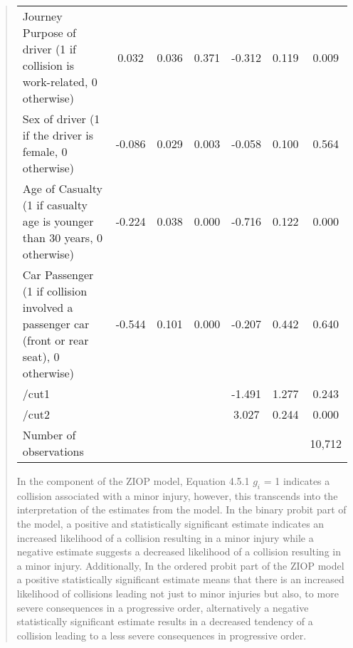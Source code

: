 \documentclass[12]{report}
\begin{document}
\begin{quote}
{\begin{table}[H]
\begin{tabular}{p{10.2cm} ccc ccc}
Journey Purpose of driver (1 if collision is work-related, 0 otherwise) & 0.032 & 0.036 & 0.371 & -0.312 & 0.119 & 0.009 \\

Sex of driver (1 if the driver is female, 0 otherwise) & -0.086 & 0.029 & 0.003 & -0.058 & 0.100 & 0.564 \\

Age of Casualty (1 if casualty age is younger than 30 years, 0 otherwise) & -0.224 & 0.038 & 0.000 & -0.716 & 0.122 & 0.000 \\

Car Passenger (1 if collision involved a passenger car (front or rear seat), 0 otherwise) & -0.544 & 0.101 & 0.000 & -0.207 & 0.442 & 0.640 \\
\midrule
/cut1 & & & & -1.491 & 1.277 & 0.243 \\
/cut2 & & & & 3.027 & 0.244 & 0.000 \\
Number of observations & & & & && 10,712\\
\bottomrule
\end{tabular}
\end{table}

In the component of the ZIOP model, Equation 4.5.1 $g_i$ = 1 indicates a collision associated with a minor injury, however, this transcends into the interpretation of the estimates from the model. In the binary probit part of the model, a positive and statistically significant estimate indicates an increased likelihood of a collision resulting in a minor injury while a negative estimate suggests a decreased likelihood of a collision resulting in a minor injury. Additionally, In the ordered probit part of the ZIOP model a positive statistically significant estimate  means that there is an increased likelihood of collisions leading not just to minor injuries but also, to more severe consequences in a progressive order, alternatively a negative statistically significant estimate results in a decreased tendency of a collision leading to a less severe consequences in progressive order.

}
\end{quote}
\end{document}
